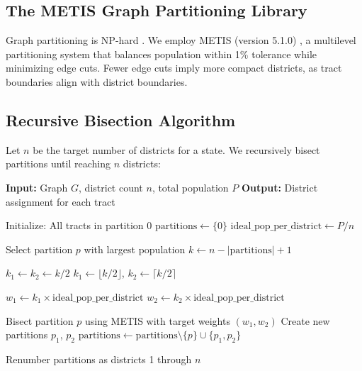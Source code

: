 \subsection{The METIS Graph Partitioning Library}

Graph partitioning is NP-hard \cite{karypis1998fast}. We employ METIS (version 5.1.0) \cite{karypis1995metis}, a multilevel partitioning system that balances population within 1\% tolerance while minimizing edge cuts. Fewer edge cuts imply more compact districts, as tract boundaries align with district boundaries.

\subsection{Recursive Bisection Algorithm}

Let $n$ be the target number of districts for a state. We recursively bisect partitions until reaching $n$ districts:

\begin{algorithm}[H]
\caption{Recursive Bisection Redistricting}
\begin{algorithmic}[1]
\State \textbf{Input:} Graph $G$, district count $n$, total population $P$
\State \textbf{Output:} District assignment for each tract

\State Initialize: All tracts in partition 0
\State $\text{partitions} \gets \{0\}$
\State $\text{ideal\_pop\_per\_district} \gets P / n$

    \State Select partition $p$ with largest population
    \State $k \gets n - |\text{partitions}| + 1$ 

        \State $k_1 \gets k_2 \gets k / 2$ 
    \Else
        \State $k_1 \gets \lfloor k / 2 \rfloor$, $k_2 \gets \lceil k / 2 \rceil$ 
    \EndIf

    \State $w_1 \gets k_1 \times \text{ideal\_pop\_per\_district}$
    \State $w_2 \gets k_2 \times \text{ideal\_pop\_per\_district}$

    \State Bisect partition $p$ using METIS with target weights $(w_1, w_2)$
    \State Create new partitions $p_1$, $p_2$
    \State $\text{partitions} \gets \text{partitions} \setminus \{p\} \cup \{p_1, p_2\}$
\EndWhile

\State Renumber partitions as districts 1 through $n$
\end{algorithmic}
\end{algorithm}

